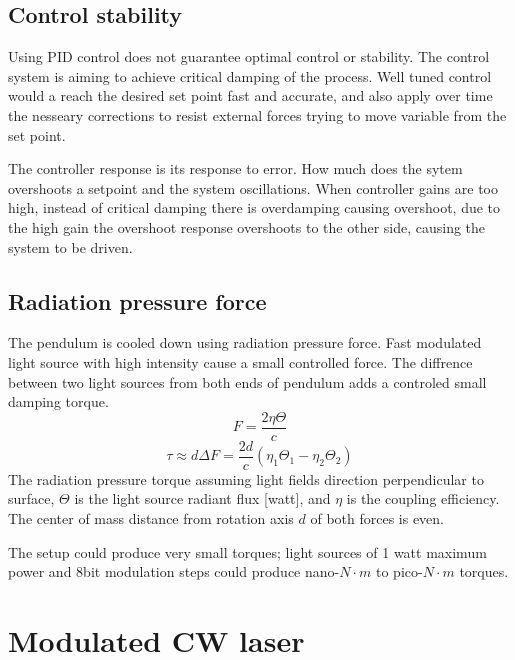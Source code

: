 \documentclass[\main/master.tex]{subfiles}
\begin{document}
\subsection{Control stability}
Using PID control does not guarantee optimal control or stability. The control system is aiming to achieve critical damping of the process. Well tuned control would a reach the desired set point fast and accurate, and also apply over time the nesseary corrections to resist external forces trying to move variable from the set point.
\par\noindent
The controller response is its response to error. How much does the sytem overshoots a setpoint and the system oscillations. When controller gains are too high, instead of critical damping there is overdamping causing overshoot, due to the high gain the overshoot response overshoots to the other side, causing the system to be driven.
\subsection{Radiation pressure force}
The pendulum is cooled down using radiation pressure force. Fast modulated light source with high intensity cause a small controlled force. The diffrence between two light sources from both ends of pendulum adds a controled small damping torque. 
\begin{equation}
F = \frac{2\eta\Theta}{{c}} \label{eqn:radiation force}
\end{equation}
\begin{equation}
\tau\approx d\Delta F = \frac{2d}{{c}} (\eta_1\Theta_1 -\eta_2\Theta_2) \label{eqn:radiation torque}
\end{equation}
The radiation pressure torque assuming light fields direction perpendicular to surface, $\Theta$ is the light source radiant flux [watt], and $\eta$ is the coupling efficiency. The center of mass distance from rotation axis $d$ of both forces is even.
\par\noindent
The setup could produce very small torques; light sources of 1 watt maximum power and 8bit modulation steps could produce nano-$N\cdot m$ to pico-$N\cdot m$ torques. 










\section{Modulated CW laser}
\end{document}

